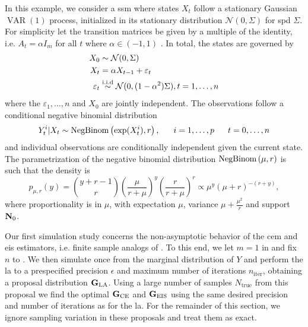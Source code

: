 \begin{example}
    \label{ex:negbinom-ar1}
    In this example, we consider a \gls{ssm} where states $X_{t}$ follow a stationary Gaussian $\operatorname{VAR}(1)$ process, initialized in its stationary distribution $\mathcal N(0,\Sigma)$ for \acrshort{spd} $\Sigma$. For simplicity let the transition matrices be given by a multiple of the identity, i.e. $A_{t} = \alpha I_{m}$ for all $t$ where $\alpha \in (-1, 1)$ . 
    In total, the states are governed by
    \begin{align*}
    X_{0} &\sim \mathcal N(0,\Sigma) \\
    X_{t} &= \alpha X_{t - 1} + \varepsilon_{t}\\
    \varepsilon_t &\stackrel{\text{i.i.d}}{\sim} \mathcal N(0, (1 - \alpha^{2})\Sigma), t = 1, \dots, n
    \end{align*}
    where the $\varepsilon_{1}, \dots, n$ and $X_{0}$ are jointly independent. The observations follow a conditional negative binomial distribution 
    $$
    Y^{i}_{t} | X_{t} \sim \operatorname{NegBinom} \left( \exp(X^{i}_{t}), r \right), \phantom{and} i = 1, \dots, p \phantom{and} t = 0, \dots, n
    $$
    and individual observations are conditionally independent given the current state. The parametrization of the negative binomial distribution $\operatorname{NegBinom} \left( \mu, r \right)$ is such that the density is
    $$
        p_{\mu, r}(y) = \binom{y + r - 1}{r} \left( \frac{\mu}{r + \mu} \right)^{y} \left( \frac{r}{r + \mu} \right)^{r} \propto \mu^{y} (\mu + r)^{-(r + y)},
    $$
    where proportionality is in $\mu$, with expectation $\mu$, variance $\mu + \frac{\mu^{2}}{r}$ and support $\mathbf N_{0}$. 
\end{example}


Our first simulation study concerns the non-asymptotic behavior of the \gls{cem} and \gls{eis} estimators, i.e. finite sample analogs of . To this end,
we let $m = 1$ in  and fix $n$ to . 
We then simulate once from the marginal distribution of $Y$ and perform the \gls{la} to a prespecified precision $\epsilon$ and maximum number of iterations $n_{\text{iter}}$, obtaining a proposal distribution $\mathbf G_{{\text{LA}}}$. Using a large number of samples $N_{\text{true}}$ from this proposal we find the optimal $\mathbf G_{{\text{CE}}}$ and $\mathbf G_{{\text{EIS}}}$ using the same desired precision and number of iterations as for the \gls{la}. For the remainder of this section, we ignore sampling variation in these proposals and treat them as exact. 

